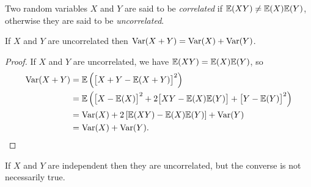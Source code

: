 \begin{definition} 
Two random variables $X$ and $Y$ are said to be \emph{correlated} if $\mathbb{E}(XY)\neq\mathbb{E}(X)\mathbb{E}(Y)$, otherwise they are said to be \emph{uncorrelated}.
\end{definition}

\begin{theorem}\label{thm:additivity_of_variance}
If $X$ and $Y$ are uncorrelated then $\text{Var}(X+Y) = \text{Var}(X) + \text{Var}(Y)$.
\end{theorem}

\begin{proof}
If $X$ and $Y$ are uncorrelated, we have $\mathbb{E}(XY)=\mathbb{E}(X)\mathbb{E}(Y)$, so
\begin{align*}
\text{Var}(X+Y)	& = \mathbb{E}\left(\big[X+Y - \mathbb{E}(X+Y)\big]^2\right) \\
			& = \mathbb{E}\left(\big[X-\mathbb{E}(X)\big]^2 + 2\big[XY-\mathbb{E}(X)\mathbb{E}(Y)\big] + \big[Y-\mathbb{E}(Y)\big]^2\right) \\
			& = \text{Var}(X) + 2\left[\mathbb{E}(XY)-\mathbb{E}(X)\mathbb{E}(Y)\right] + \text{Var}(Y) \\
			& = \text{Var}(X) + \text{Var}(Y).
\end{align*}
\vspace*{-3ex}
\end{proof}
\begin{remark}
If $X$ and $Y$ are independent then they are uncorrelated, but the converse is not necessarily true.
\end{remark}

